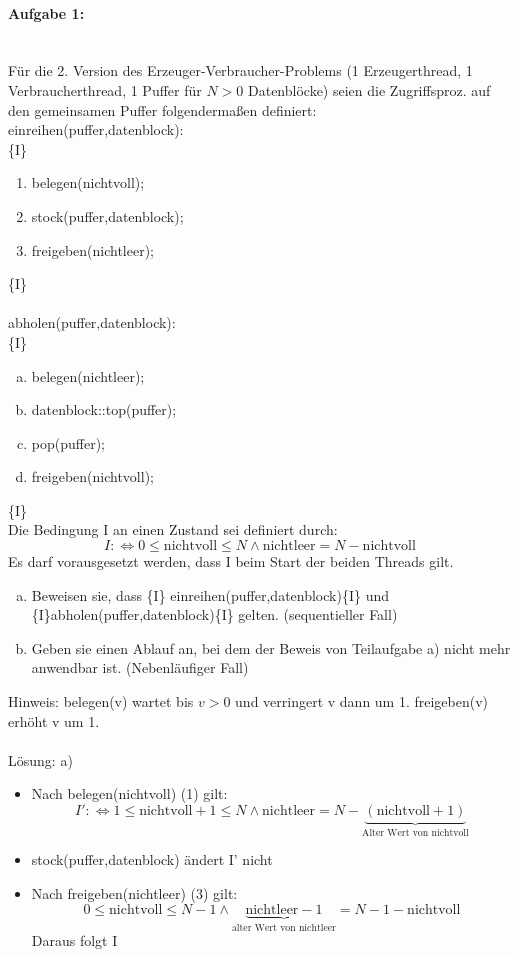\documentclass[a4paper,12pt]{scrartcl}
\begin{document}
 \paragraph{Aufgabe 1:}\quad\\
 Für die 2. Version des Erzeuger-Verbraucher-Problems (1 Erzeugerthread, 1 Verbraucherthread, 1 Puffer für $N>0$ Datenblöcke) seien die Zugriffsproz. auf den gemeinsamen Puffer folgendermaßen definiert:\\
 einreihen(puffer,datenblock):\\
 \{I\}
 \begin{enumerate}
  \item belegen(nichtvoll);
  \item stock(puffer,datenblock);
  \item freigeben(nichtleer);
 \end{enumerate}
  \{I\}\\
  \\
  abholen(puffer,datenblock):\\
  \{I\}
  \begin{enumerate}[(a)]
   \item belegen(nichtleer);
   \item datenblock::top(puffer);
   \item pop(puffer);
   \item freigeben(nichtvoll);
  \end{enumerate}
  \{I\}\\
  Die Bedingung I an einen Zustand sei definiert durch:
  $$I:\Leftrightarrow0\leq\text{nichtvoll}\leq N \wedge \text{nichtleer}=N-\text{nichtvoll} $$
  Es darf vorausgesetzt werden, dass I beim Start der beiden Threads gilt.
  \begin{enumerate}[a)]
   \item Beweisen sie, dass \{I\} einreihen(puffer,datenblock)\{I\} und \{I\}abholen(puffer,datenblock)\{I\} gelten. (sequentieller Fall)
   \item Geben sie einen Ablauf an, bei dem der Beweis von Teilaufgabe a) nicht mehr anwendbar ist. (Nebenläufiger Fall)
  \end{enumerate}
  Hinweis: belegen(v) wartet bis $v>0$ und verringert v dann um 1. freigeben(v) erhöht v um 1.\\
  \\
  Lösung: a)\\
  \begin{itemize}
   \item Nach belegen(nichtvoll) (1) gilt:
   $$I':\Leftrightarrow1\leq\text{nichtvoll}+1\leq N \wedge \text{nichtleer}=N-\underbrace{(\text{nichtvoll}+1)}_{\text{Alter Wert von nichtvoll}} $$
   \item stock(puffer,datenblock) ändert I' nicht
   \item Nach freigeben(nichtleer) (3) gilt:
   $$0\leq\text{nichtvoll}\leq N-1 \wedge \underbrace{\text{nichtleer}-1}_{\text{alter Wert von nichtleer}}=N-1-\text{nichtvoll}$$
   Daraus folgt I
  \end{itemize}
\end{document}
